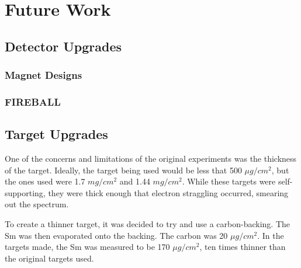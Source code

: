 %
%
%
%
%
%
%
%
%
%


%
%

\chapter{Future Work}

\section{Detector Upgrades}

\subsection{Magnet Designs}

\subsection{FIREBALL}

\section{Target Upgrades}

One of the concerns and limitations of the original experiments was the thickness of the target. Ideally, the target being used would be less that 500 $\mu g/cm^2$, but the ones used were 1.7 $mg/cm^2$ and 1.44 $mg/cm^2$. While these targets were self-supporting, they were thick enough that electron straggling occurred, smearing out the spectrum.

To create a thinner target, it was decided to try and use a carbon-backing. The Sm was then evaporated onto the backing. The carbon was 20 $\mu g/cm^2$. In the targets made, the Sm was measured to be 170 $\mu g/cm^2$, ten times thinner than the original targets used.


